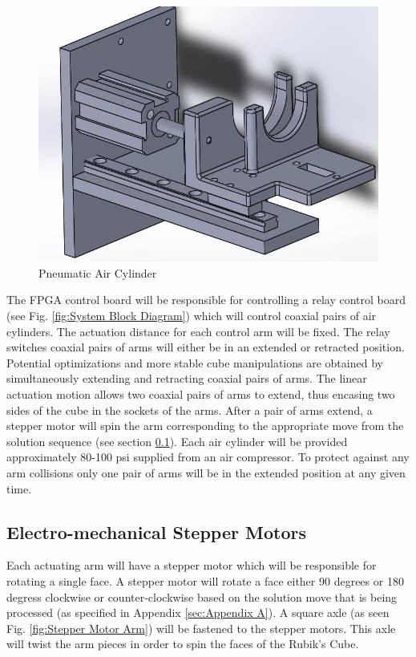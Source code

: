 \documentclass[final, letterpaper, 10 pt, conference, onecolumn]{IEEEtran}
\begin{document}
\begin{figure}[!ht]
\centering
\includegraphics[scale=0.5]{AirCylinder.jpg}
\caption{Pneumatic Air Cylinder}
\label{fig:Pneumatic Air Cylinder}
\end{figure}

The FPGA control board will be responsible for controlling a relay control board (see Fig. \ref{fig:System Block Diagram}) which will control coaxial pairs of air cylinders. The actuation distance for each control arm will be fixed. The relay switches coaxial pairs of arms will either be in an extended or retracted position. Potential optimizations and more stable cube manipulations  are obtained by simultaneously extending and retracting coaxial pairs of arms. The linear actuation motion allows two coaxial pairs of
arms to extend, thus encasing two sides of the cube in the sockets of the arms. After a pair of arms extend,
a stepper motor will spin the arm corresponding to the appropriate move from the solution sequence (see section \ref{sec:Stepper Motors}). Each air cylinder will be provided approximately 80-100 psi supplied from an air compressor. To protect against any
arm collisions only one pair of arms will be in the extended position at any given time.


\subsection{Electro-mechanical Stepper Motors}
\label{sec:Stepper Motors}
Each actuating arm will have a stepper motor which will be responsible for rotating a single face. A stepper motor will rotate a face either 90 degrees or 180 degress clockwise or counter-clockwise based on the solution move that is being processed (as specified in Appendix \ref{sec:Appendix A}). A square axle (as seen Fig. \ref{fig:Stepper Motor Arm}) will be fastened to the stepper motors. This axle will twist the arm pieces in order to spin the faces of the Rubik's Cube.
\end{document}
